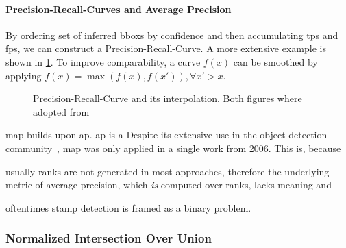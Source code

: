 \paragraph{Precision-Recall-Curves and Average Precision}\label{par:precision-recall-curves-ap}
By ordering set of inferred \glspl{bbox} by confidence and then accumulating
\glspl{tp} and \glspl{fp}, we can construct a Precision-Recall-Curve.
A more extensive example is shown in \cref{fig:precision-recall-curve}.
To improve comparability, a curve \(f(x)\) can be smoothed by applying
\(f(x) = \max (f(x), f(x')), \forall x' > x\). 

\begin{figure}[!tpb]
    \center
    \caption[short={Precision-Recall-Curve}]{Precision-Recall-Curve and its
    interpolation. Both figures where adopted from~\cite{Padilla.2019}}
    \label{fig:precision-recall-curve}
\end{figure}

\Gls{map} builds upon \gls{ap}. \Gls{ap} is a 
Despite its extensive use in the object detection community~\cite{Liu.2016,Ren.2015}, 
\Gls{map} was only applied in a single work \cite{Zhu.2006} from 2006. This is,
because 
\begin{enumerate*}[i.)]
    \item usually ranks are not generated in most approaches, therefore the 
    underlying metric of average precision, which \textit{is} computed over ranks, 
    lacks meaning and
    \item oftentimes stamp detection is framed as a binary problem.
\end{enumerate*} 

\subsubsection{Normalized Intersection Over Union}\label{subsect:normalized-iou}
\blindtext[1]

